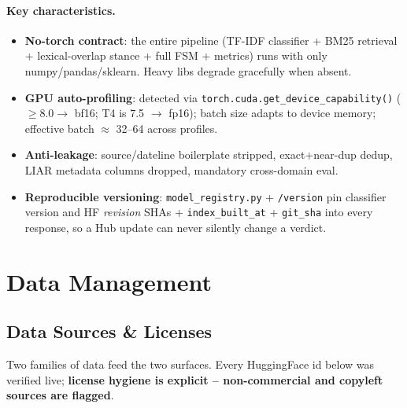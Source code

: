 \documentclass[12pt,a4paper]{article}
\begin{document}
\paragraph{Key characteristics.}
\begin{itemize}\setlength\itemsep{0.15em}
  \item \textbf{No-torch contract}: the entire pipeline (TF-IDF classifier + BM25 retrieval + lexical-overlap stance + full FSM + metrics) runs with only numpy/pandas/sklearn. Heavy libs degrade gracefully when absent.
  \item \textbf{GPU auto-profiling}: detected via \texttt{torch.cuda.get\_device\_capability()} ($\geq 8.0 \rightarrow$ bf16; T4 is 7.5 $\rightarrow$ fp16); batch size adapts to device memory; effective batch $\approx$ 32--64 across profiles.
  \item \textbf{Anti-leakage}: source/dateline boilerplate stripped, exact+near-dup dedup, LIAR metadata columns dropped, mandatory cross-domain eval.
  \item \textbf{Reproducible versioning}: \texttt{model\_registry.py} + \texttt{/version} pin classifier version and HF \emph{revision} SHAs + \texttt{index\_built\_at} + \texttt{git\_sha} into every response, so a Hub update can never silently change a verdict.
\end{itemize}

\section{Data Management}

\subsection{Data Sources \& Licenses}

Two families of data feed the two surfaces. Every HuggingFace id below was verified live; \textbf{license hygiene is explicit -- non-commercial and copyleft sources are flagged}.
\end{document}
